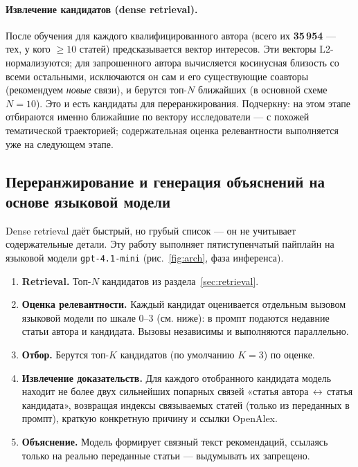 \paragraph{Извлечение кандидатов (dense retrieval).} После обучения для каждого
квалифицированного автора (всего их \textbf{35\,954} — тех, у кого $\geq 10$ статей) предсказывается
вектор интересов. Эти векторы L2-нормализуются; для запрошенного автора вычисляется косинусная
близость со всеми остальными, исключаются он сам и его существующие соавторы (рекомендуем
\emph{новые} связи), и берутся топ-$N$ ближайших (в основной схеме $N = 10$). Это и есть кандидаты для
переранжирования. Подчеркну: на этом этапе отбираются именно ближайшие по вектору исследователи —
с похожей тематической траекторией; содержательная оценка релевантности выполняется уже на
следующем этапе.

\subsection{Переранжирование и генерация объяснений на основе языковой модели}
\label{sec:rerank}

Dense retrieval даёт быстрый, но грубый список — он не учитывает содержательные детали. Эту работу
выполняет пятиступенчатый пайплайн на языковой модели \texttt{gpt-4.1-mini} (рис.~\ref{fig:arch},
фаза инференса).

\begin{enumerate}
  \item \textbf{Retrieval.} Топ-$N$ кандидатов из раздела~\ref{sec:retrieval}.
  \item \textbf{Оценка релевантности.} Каждый кандидат оценивается отдельным вызовом языковой
        модели по шкале 0–3 (см. ниже): в промпт подаются недавние статьи автора и кандидата.
        Вызовы независимы и выполняются параллельно.
  \item \textbf{Отбор.} Берутся топ-$K$ кандидатов (по умолчанию $K = 3$) по оценке.
  \item \textbf{Извлечение доказательств.} Для каждого отобранного кандидата модель находит не
        более двух сильнейших попарных связей «статья автора\,$\leftrightarrow$\,статья кандидата»,
        возвращая индексы связываемых статей (только из переданных в промпт), краткую конкретную
        причину и ссылки OpenAlex.
  \item \textbf{Объяснение.} Модель формирует связный текст рекомендаций, ссылаясь только на
        реально переданные статьи — выдумывать их запрещено.
\end{enumerate}

